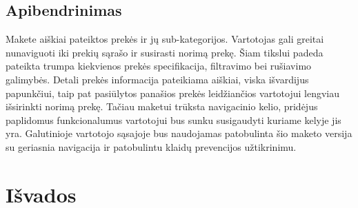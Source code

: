 \documentclass[oneside]{VUMIFPSkursinis}
\begin{document}
\begin{center}
\begin{tabular}{ |p{4cm}| p{6cm} | p{7cm} | }
	
	
	
   \hline
    \end{tabular}
\end{center}

\pagebreak
	\subsection{Apibendrinimas}
Makete aiškiai pateiktos prekės ir jų sub-kategorijos. Vartotojas gali greitai nunaviguoti iki prekių sąrašo ir susirasti norimą prekę. Šiam tikslui padeda pateikta trumpa kiekvienos prekės specifikacija, filtravimo bei rušiavimo galimybės. Detali prekės informacija pateikiama aiškiai, viska išvardijus papunkčiui, taip pat pasiūlytos panašios prekės leidžiančios vartotojui lengviau išsirinkti norimą prekę. Tačiau maketui trūksta navigacinio kelio, pridėjus paplidomus funkcionalumus vartotojui bus sunku susigaudyti kuriame kelyje jis yra. Galutinioje vartotojo sąsajoje bus naudojamas patobulinta šio maketo versija su geriasnia navigacija ir patobulintu klaidų prevencijos užtikrinimu.

\iffalse XXXXXXXXXXXXXXXXXXXXXXXXXXXXXXXXXXXXXXXXXXXXXXXXXXXXXXXXXXXXXXXXXXXXXXXXXXXXXXXXXXXXXXXXXXXXXXXXXXXXXXXXXXXXXXXXXXXXXXXXXXXXXXXXXXXXXXX \fi
\section{Išvados}
\end{document}
